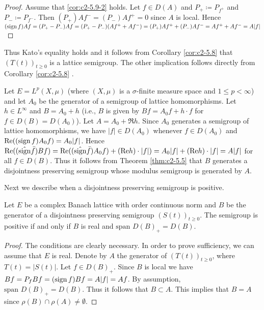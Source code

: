 \begin{proof}
Assume that \ref{cor:c2-5.9-2}   holds. 
Let $f \in D(A)$ and $P_{+} \coloneqq P_{f^{+}}$ and $P_{-} \coloneqq P_{f^{-}}$.
Then $(P_{+})Af^{-} = (P_{-})Af^{+} = 0$ since $A$ is local. 
Hence $(\operatorname{sign}  f)Af = (P_{+} - P_{-})Af = (P_{+} - P_{-})(Af^{+} + Af^{-}) = 
(P_{+})Af^{+} + (P_{-})Af^{-} = Af^{+} + Af^{-} = A|f|$
\end{proof}

Thus Kato's equality holds and it follows from Corollary \ref{cor:c2-5.8}   that $(T(t))_{t \geq 0}$ is a lattice semigroup. The other implication follows directly from Corollary  \ref{cor:c2-5.8}  .

\begin{example}\label{ex:c2-5.10}
Let $E = L^{p}(X,\mu)$ (where $(X,\mu)$ is a $\sigma$-finite measure space and $1 \leq p < \infty$) and let $A_{0}$ be the generator of a semigroup of lattice homomorphisms. 
Let $h \in L^{\infty}$ and $B = A_{0} + h$ (i.e., $B$ is given by $Bf = A_{0}f + h \cdot f$ for $f \in D(B) = D(A_{0})$). 
Let $A = A_{0} + \Re  h$.
Since $A_{0}$ generates a semigroup of lattice homomorphisms, we have $|f| \in D(A_{0})$ whenever $f \in D(A_{0})$ and $\mathop{}\!\mathrm{Re}((\operatorname{sign}  f)A_{0}f) = A_{0}|f|$.
Hence $\mathop{}\!\mathrm{Re}((\hat{\operatorname{sign}}  \bar{f})Bf) = \mathop{}\!\mathrm{Re}((\hat{\operatorname{sign}}  \bar{f})A_{0}f) + (\mathop{}\!\mathrm{Re}  h) \cdot |f|) = A_{0}|f| + (\mathop{}\!\mathrm{Re}  h) \cdot |f| = A|f|$ for all $f \in D(B)$. 
Thus it follows from Theorem \ref{thm:c2-5.5}   that $B$ generates a disjointness preserving semigroup whose modulus semigroup is generated by $A$.
\end{example}

Next we describe when a disjointness preserving semigroup is positive.

\begin{proposition}\label{prop:c2-5.11}
Let $E$ be a complex Banach lattice with order continuous norm and $B$ be the generator of a disjointness preserving semigroup $(S(t))_{t \geq 0}$. 
The semigroup is positive if and only if $B$ is real and $\text{span } D(B)_{+} = D(B)$.
\end{proposition}

\begin{proof}
The conditions are clearly necessary. 
In order to prove sufficiency, we can assume that $E$ is real. 
Denote by $A$ the generator of $(T(t))_{t \geq 0}$, where $T(t) = |S(t)|$. 
Let $f \in D(B)_{+}$. 
Since $B$ is local we have $Bf = P_{f}Bf = (\operatorname{sign}  f)Bf = A|f| = Af$. 
By assumption, $\text{span } D(B)_{+} = D(B)$. 
Thus it follows that $B \subset A$. 
This implies that $B = A$ since $\rho(B) \cap \rho(A) \neq \emptyset$.
\end{proof}

